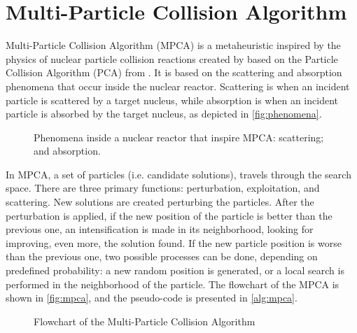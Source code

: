 \section{Multi-Particle Collision Algorithm}
\label{sec:mpca}

Multi-Particle Collision Algorithm (MPCA) is a metaheuristic inspired by the physics of nuclear particle collision reactions created by  based on the Particle Collision Algorithm (PCA) from . It is based on the scattering and absorption phenomena that occur inside the nuclear reactor. Scattering is when an incident particle is scattered by a target nucleus, while absorption is when an incident particle is absorbed by the target nucleus, as depicted in \autoref{fig:phenomena}.

\begin{figure}[H]%
\caption{Phenomena inside a nuclear reactor that inspire MPCA:  scattering; and  absorption.}%
\label{fig:phenomena}%
\vspace{1em}
\centering
{}
\hspace{8pt}%
%
\end{figure}

In MPCA, a set of particles (i.e. candidate solutions), travels through the search space. There are three primary functions: perturbation, exploitation, and scattering. New solutions are created perturbing the particles. After the perturbation is applied, if the new position of the particle is better than the previous one, an intensification is made in its neighborhood, looking for improving, even more, the solution found. If the new particle position is worse than the previous one, two possible processes can be done, depending on predefined probability: a new random position is generated, or a local search is performed in the neighborhood of the particle. The flowchart of the MPCA is shown in \autoref{fig:mpca}, and the pseudo-code is presented in \autoref{alg:mpca}.

\begin{figure}[H]
\caption{Flowchart of the Multi-Particle Collision Algorithm}
\label{fig:mpca}
\centering
\vspace{1em}
\end{figure}

